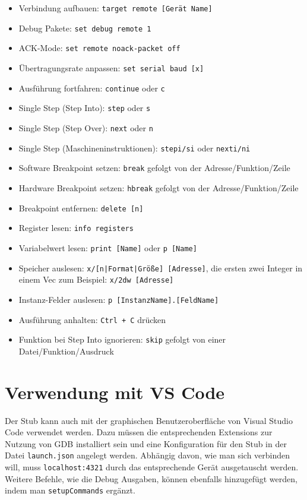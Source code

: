 \begin{itemize}
\item Verbindung aufbauen: \texttt{target remote [Gerät Name]}
\item Debug Pakete: \texttt{set debug remote 1}
\item ACK-Mode: \texttt{set remote noack-packet off}
\item Übertragungsrate anpassen: \texttt{set serial baud [x]}
\item Ausführung fortfahren: \texttt{continue} oder \texttt{c}
\item Single Step (Step Into): \texttt{step} oder \texttt{s}
\item Single Step (Step Over): \texttt{next} oder \texttt{n}
\item Single Step (Maschineninstruktionen): \texttt{stepi/si} oder \texttt{nexti/ni}
\item Software Breakpoint setzen: \texttt{break} gefolgt von der Adresse/Funktion/Zeile
\item Hardware Breakpoint setzen: \texttt{hbreak} gefolgt von der Adresse/Funktion/Zeile
\item Breakpoint entfernen: \texttt{delete [n]}
\item Register lesen: \texttt{info registers}
\item Variabelwert lesen: \texttt{print [Name]} oder \texttt{p [Name]}
\item Speicher auslesen: \texttt{x/[n|Format|Größe] [Adresse]}, die ersten zwei Integer in einem Vec zum Beispiel: \texttt{x/2dw [Adresse]}
\item Instanz-Felder auslesen: \texttt{p [InstanzName].[FeldName]}
\item Ausführung anhalten: \texttt{Ctrl + C} drücken
\item Funktion bei Step Into ignorieren: \texttt{skip} gefolgt von einer Datei/Funktion/Ausdruck
\end{itemize}


\section{Verwendung mit VS Code}
Der Stub kann auch mit der graphischen Benutzeroberfläche von Visual Studio Code verwendet werden. Dazu müssen die entsprechenden Extensions zur Nutzung von GDB installiert sein und eine Konfiguration für den Stub in der Datei \texttt{launch.json} angelegt werden. Abhängig davon, wie man sich verbinden will, muss \texttt{localhost:4321} durch das entsprechende Gerät ausgetauscht werden. Weitere Befehle, wie die Debug Ausgaben, können ebenfalls hinzugefügt werden, indem man \texttt{setupCommands} ergänzt.

